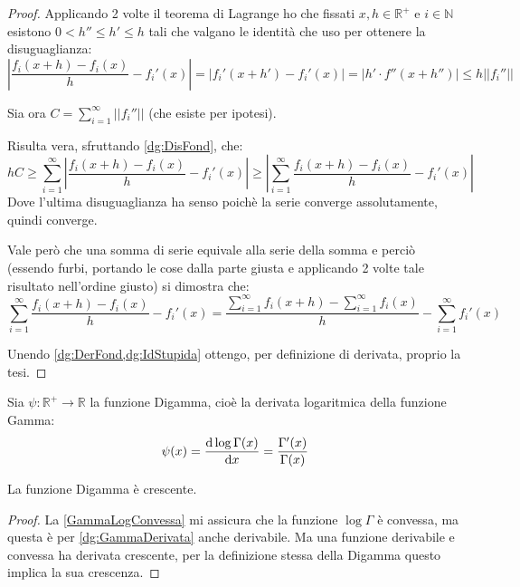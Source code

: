 \begin{proof}
	Applicando 2 volte il teorema di Lagrange ho che fissati $x,h\in\mathbb{R^+}$ e $i\in\mathbb{N}$
	esistono $0<h''\le h'\le h$ tali che valgano le identità che uso per ottenere la disuguaglianza:
	\begin{equation}\label{dg:DisFond}
		\left\lvert\frac{f_i(x+h)-f_i(x)}h - f_i'(x)\right\rvert=\left\lvert f_i'(x+h') - f_i'(x)\right\rvert
		=\left\lvert h'\cdot f''(x+h'') \right\rvert\le h||f_i''||
	\end{equation}
	
	Sia ora $C=\sum_{i=1}^{\infty} ||f_i''||$ (che esiste per ipotesi).
	
	Risulta vera, sfruttando \cref{dg:DisFond}, che:
	\begin{equation}\label{dg:DerFond}
		hC\ge \sum_{i=1}^{\infty}\left\lvert\frac{f_i(x+h)-f_i(x)}h - f_i'(x)\right\rvert \ge
		\left\lvert\sum_{i=1}^{\infty}\frac{f_i(x+h)-f_i(x)}h - f_i'(x)\right\rvert
	\end{equation}
	Dove l'ultima disuguaglianza ha senso poichè la serie converge assolutamente, quindi converge.
	
	Vale però che una somma di serie equivale alla serie della somma e perciò
	(essendo furbi, portando le cose dalla parte giusta e applicando 2 volte tale risultato nell'ordine giusto)
	si dimostra che:
	\begin{equation}\label{dg:IdStupida}
		\sum_{i=1}^{\infty}\frac{f_i(x+h)-f_i(x)}h - f_i'(x)=
		\frac{\sum_{i=1}^{\infty} f_i(x+h)- \sum_{i=1}^{\infty}f_i(x)}h -\sum_{i=1}^{\infty}f_i'(x)
	\end{equation}

	Unendo \cref{dg:DerFond,dg:IdStupida} ottengo, per definizione di derivata, proprio la tesi.
\end{proof}

\begin{definition}\label{dg:Digamma}
	Sia $\psi:\mathbb{R^+}\to\mathbb{R}$ la funzione Digamma, cioè la derivata logaritmica della funzione Gamma:
	\begin{equation*}
		\psi(x)=\frac{\mathrm{d} \log\Gamma(x)}{\mathrm{d} x}=\frac{\Gamma'(x)}{\Gamma(x)}
	\end{equation*}
\end{definition}

\begin{lemma}\label{dg:DigammaCresc}
	La funzione Digamma è crescente.
\end{lemma}
\begin{proof}
	La \cref{GammaLogConvessa} mi assicura che la funzione $\log\Gamma$ è convessa, ma questa è per \cref{dg:GammaDerivata}
	anche derivabile. Ma una funzione derivabile e convessa ha derivata crescente, per la definizione stessa della Digamma
	questo implica la sua crescenza.
\end{proof}

